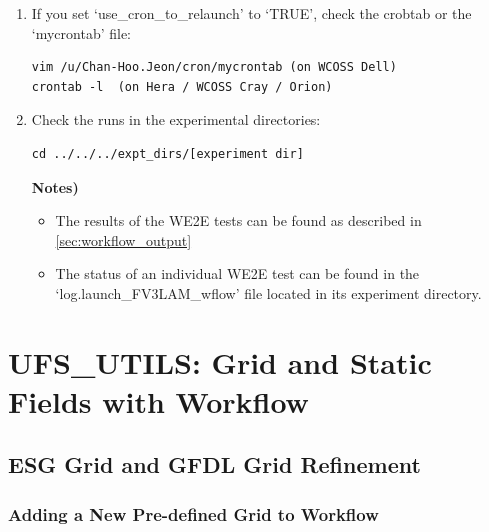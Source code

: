 \documentclass[11pt,fleqn]{report}              %
\begin{document}
\begin{enumerate}
\item If you set `use\_cron\_to\_relaunch' to `TRUE', check the crobtab or the `mycrontab' file:
\lstset{language=bash}   
\begin{lstlisting}[frame=trBL]
vim /u/Chan-Hoo.Jeon/cron/mycrontab (on WCOSS Dell)
crontab -l  (on Hera / WCOSS Cray / Orion)
\end{lstlisting}

\item Check the runs in the experimental directories:
\lstset{language=bash}   
\begin{lstlisting}[frame=trBL]
cd ../../../expt_dirs/[experiment dir]
\end{lstlisting}

{\bf Notes)} 
\begin{itemize}
\item The results of the WE2E tests can be found as described in \ref{sec:workflow_output}
\item The status of an individual WE2E test can be found in the `log.launch\_FV3LAM\_wflow' file located in its experiment directory. 
\end{itemize}
\end{enumerate}




\chapter{UFS\_UTILS: Grid and Static Fields with Workflow}                 
\label{chpt:sar_grd_fix_workflow}

\section{ESG Grid and GFDL Grid Refinement}
\label{sec:sar_wflow_grd_esg_gfdl}

\subsection{Adding a New Pre-defined Grid to Workflow}
\label{subsec:new_predef_grid}
\end{document}
